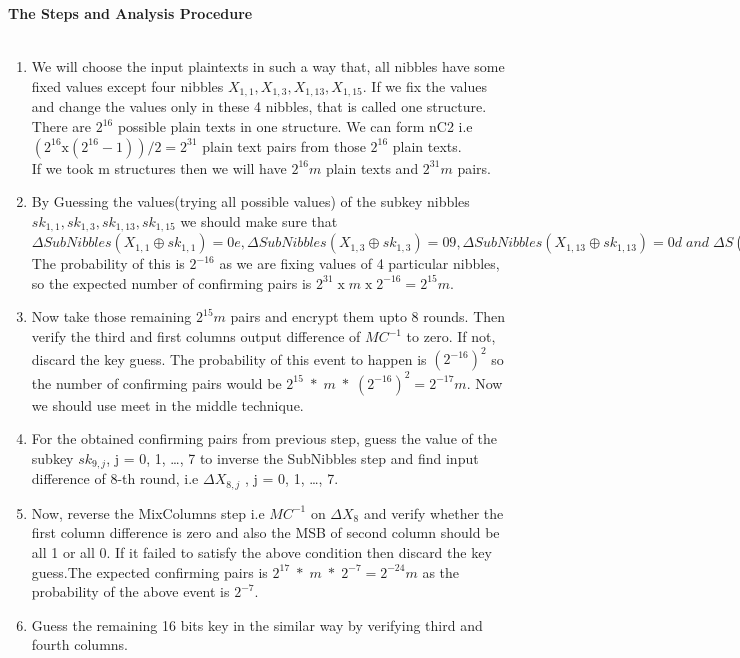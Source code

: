 \documentclass[preprint]{transcrypto}
\begin{document}
\\ \\
\textbf{ The Steps and Analysis Procedure}\\ \\
\begin{enumerate}
\item We will choose the input plaintexts in such a way that, all nibbles have some fixed values except four nibbles $X_{1,1} , X_{1,3} , X_{1,13} , X_{1,15}$. If we fix the values and change the values only in these 4 nibbles, that is called one structure. There are $2^{16}$ possible plain texts in one structure.
We can form nC2 i.e $(2^{16} \text{x} (2^{16} - 1))/2 = 2^{31}$ plain text pairs from those $2^{16} $ plain texts.\\ If we took m structures then we will have $2^{16}m$ plain texts and $2^{31}m$ pairs.\\
\item By Guessing the values(trying all possible values)  of the subkey nibbles $sk_{1,1} , sk_{1,3} , sk_{1,13} , sk_{1,15}$ we should make sure that $\Delta SubNibbles(X_{1,1} \oplus sk_{1,1} ) = 0e, \Delta SubNibbles(X_{1,3} \oplus sk_{1,3} ) = 09, \Delta SubNibbles(X_{1,13} \oplus sk_{1,13} ) =
0d\; and \;\Delta S(X_{1,15} \oplus sk_{1,15} ) = 0b.$ The probability of this is $2^{-16}$ as we are fixing values of 4 particular nibbles, so the expected number of confirming pairs is $2^{31} \;\text{x}\; m\; \text{x} \;2^{-16} = 2^{15} m$. \\
\item  Now take those remaining $2^{15}m$ pairs and encrypt them upto 8 rounds. Then verify the third and first columns output difference of $MC^{-1}$  to zero. If not, discard the key guess. The probability of this event to happen is $(2 ^{-16})^{2}$ so the number of confirming pairs would be $2^{15} \;*\; m \;*\; (2 ^{-16})^{2} = 2^{-17}m$. Now we should use meet in the middle technique. \\ 
\item  For the obtained confirming pairs from previous step,  guess the value of the subkey $sk_{9,j}$, j = 0, 1, \ldots, 7 to inverse the SubNibbles step and find input difference of 8-th round, i.e $\Delta X_{8,j}$ , j = 0, 1, \ldots, 7. \\
\item Now, reverse the MixColumns step i.e $MC^{-1}$ on $\Delta X_{8}$ and verify whether the first column difference is zero and also the MSB of second column should be all 1 or all 0. If it failed to satisfy the above condition then discard the key guess.The expected confirming pairs is $2^{17}\;*\;m\;*\;2^{-7} = 2^{-24}m$ as the probability of the above event is $2^{-7}$.
\item Guess the remaining 16 bits key in the similar way by verifying third and fourth columns.

\end{enumerate}
\end{document}
